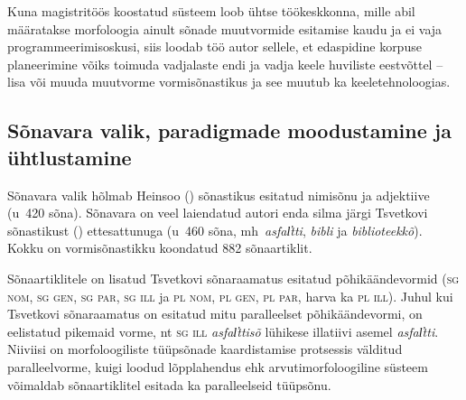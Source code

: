 \documentclass[12pt,a4paper]{article}
\newcommand{\vadja}[1]{\textit{#1}}
\newcommand{\msd}[1]{\textsc{#1}}
\begin{document}

Kuna magistritöös koostatud süsteem loob ühtse töökeskkonna, mille abil määratakse morfoloogia ainult sõnade muut\-vormide esitamise kaudu ja ei vaja programmeerimis\-oskusi, siis loodab töö autor sellele, et edaspidine korpuse planeerimine võiks toimuda vadjalaste endi ja vadja keele huviliste eestvõttel -- lisa või muuda muutvorme vormi\-sõnastikus ja see muutub ka keele\-tehnoloogias.



\subsection{Sõnavara valik, paradigmade moodustamine ja ühtlustamine}
\label{sec:sõnavara-valik}

Sõnavara valik hõlmab Heinsoo (\citeyear{heinsoo_vaddsonakopittoja_2015}) sõnastikus esitatud nimi\-sõnu ja adjektiive (u~420 sõna). Sõnavara on veel laiendatud autori enda silma järgi Tsvetkovi sõnastikust (\cite{laakso_vatja_1989}) ettesattunuga (u~460 sõna, mh~\vadja{asfal̕tti}, \vadja{bibli} ja \vadja{biblioteekkõ}). Kokku on vormi\-sõnastikku koondatud 882 sõna\-artiklit.

Sõnaartiklitele on lisatud Tsvetkovi sõnaraamatus esitatud põhi\-käände\-vormid (\msd{sg nom}, \msd{sg gen}, \msd{sg par}, \msd{sg ill} ja  \msd{pl nom}, \msd{pl gen}, \msd{pl par}, harva ka \msd{pl ill}). Juhul kui Tsvetkovi sõna\-raamatus on esitatud mitu paralleelset põhikäändevormi, on eelistatud pikemaid vorme, nt \msd{sg ill} \vadja{asfal̕ttisõ} lühikese illatiivi asemel \vadja{asfal̕tti}. Niiviisi on morfoloogiliste tüüpsõnade kaardistamise protsessis välditud paralleelvorme, kuigi loodud lõpplahendus ehk arvutimorfoloogiline süsteem võimaldab sõna\-artiklitel esitada ka paralleelseid tüüpsõnu. %
\end{document}
